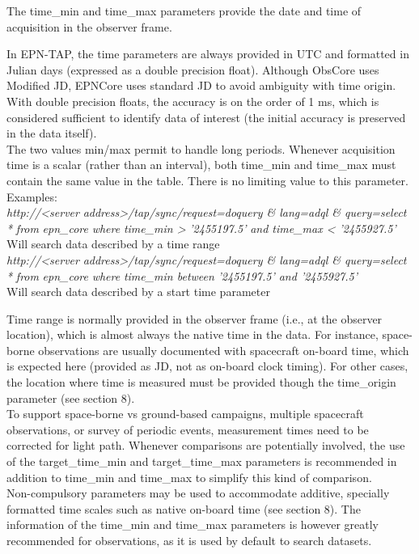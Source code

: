 \documentclass[11pt,a4paper]{ivoa}
\begin{document}
The time\_min and time\_max parameters provide the date and time of acquisition in the observer frame. 

In EPN-TAP, the time parameters are always provided in UTC and formatted in Julian days (expressed as a double precision float). Although ObsCore uses Modified JD, EPNCore uses standard JD to avoid ambiguity with time origin. With double precision floats, the accuracy is on the order of 1 ms, which is considered sufficient to identify data of interest (the initial accuracy is preserved in the data itself).\\ The two values min/max permit to handle long periods. Whenever acquisition time is a scalar (rather than an interval), both time\_min and time\_max must contain the same value in the table. There is no limiting value to this parameter.\\ Examples:\\ \emph{http://<server} \emph{address>/tap/sync/request=doquery \& lang=adql \& query=select} \emph{*} \emph{from} \emph{epn\_core} \emph{where} \emph{time\_min >} \emph{'2455197.5'} \emph{and time\_max < '2455927.5'} \\ Will search data described by a time range \\ \emph{http://<server} \emph{address>/tap/sync/request=doquery \& lang=adql \& query=select} \emph{*} \emph{from} \emph{epn\_core} \emph{where} \emph{time\_min between} \emph{'2455197.5' and '2455927.5'} \\ Will search data described by a start time parameter

Time range is normally provided in the observer frame (i.e., at the observer location), which is almost always the native time in the data. For instance, space-borne observations are usually documented with spacecraft on-board time, which is expected here (provided as JD, not as on-board clock timing). For other cases, the location where time is measured must be provided though the time\_origin parameter (see section 8).\\To support space-borne vs ground-based campaigns, multiple spacecraft observations, or survey of periodic events, measurement times need to be corrected for light path. Whenever comparisons are potentially involved, the use of the target\_time\_min and target\_time\_max parameters is recommended in addition to time\_min and time\_max to simplify this kind of comparison.\\Non-compulsory parameters may be used to accommodate additive, specially formatted time scales such as native on-board time (see section 8). The information of the time\_min and time\_max parameters is however greatly recommended for observations, as it is used by default to search datasets.
\end{document}
